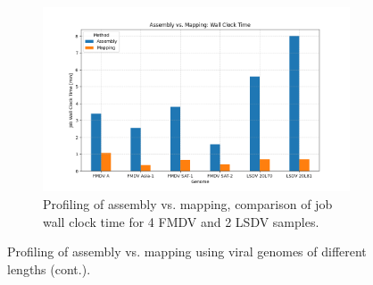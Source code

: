 \begin{figure}[ht!]\ContinuedFloat
    \centering
	\begin{subfigure}[t]{1.0\textwidth}
        \includegraphics[width=1.0\textwidth]{media/4-profiling-wallclock.png}
        \caption{Profiling of assembly vs. mapping, comparison of job wall clock time for 4 FMDV and 2 LSDV samples.}
        \label{fig:4-profiling-wallclock}
    \end{subfigure}
    \caption[Profiling of assembly vs. mapping (cont.).]{Profiling of assembly vs. mapping using viral genomes of different lengths (cont.).}
    \label{fig:apx-profiling}
\end{figure}
